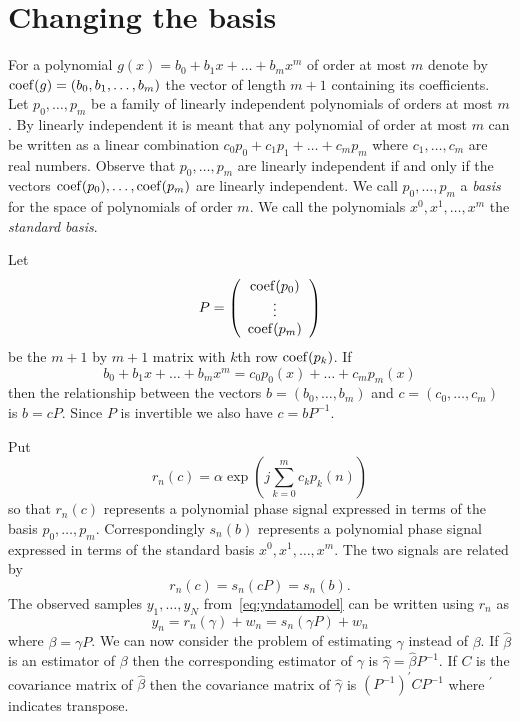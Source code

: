 \documentclass[review]{elsarticle}
\begin{document}
\section{Changing the basis}\label{sec:changing-basis}

\newcommand{\calP}{{\mathcal P}}

For a polynomial $g(x) = b_0 + b_1 x + \dots + b_m x^m$ of order at most $m$ denote by $\operatorname{coef}(g) = (b_0, b_1, \dots, b_m)$ the vector of length $m+1$ containing its coefficients.  Let $p_0,\dots, p_m$ be a family of linearly independent polynomials of orders at most $m$.  By linearly independent it is meant that any polynomial of order at most $m$ can be written as a linear combination $c_0p_0 + c_1 p_1 + \dots + c_m p_m$ where $c_1, \dots, c_m$ are real numbers.  Observe that $p_0, \dots, p_m$ are linearly independent if and only if the vectors $\operatorname{coef}(p_0), \dots, \operatorname{coef}(p_m)$ are linearly independent.  We call $p_0, \dots, p_m$ a \emph{basis} for the space of polynomials of order $m$.  We call the polynomials $x^0, x^1, \dots, x^m$ the \emph{standard basis}.  

Let 
\[
P = \left( \begin{array}{c}
\operatorname{coef}(p_0) \\
\vdots \\
\operatorname{coef}(p_m)
\end{array} \right)
\] 
be the $m+1$ by $m+1$ matrix with $k$th row $\operatorname{coef}(p_k)$.  If
\[
b_0 + b_1 x + \dots + b_m x^m = c_0 p_0(x) + \dots + c_m p_m(x)
\]
then the relationship between the vectors $b =  (b_0, \dots, b_m)$ and $c =  (c_0, \dots, c_m)$ is $b = cP$.  Since $P$ is invertible we also have $c = bP^{-1}$.

Put
\[
r_n(c) = \alpha \exp\left( j \sum_{k = 0}^{m}{c_k p_k(n)}\right)
\]
so that $r_n(c)$ represents a polynomial phase signal expressed in terms of the basis $p_0, \dots, p_m$.  Correspondingly $s_n(b)$ represents a polynomial phase signal expressed in terms of the standard basis $x^0, x^1, \dots, x^m$.  The two signals are related by
\[
r_n(c) = s_n(cP) = s_n(b).
\]
The observed samples $y_1,\dots,y_N$ from~\eqref{eq:yndatamodel} can be written using $r_n$ as
\[
y_n = r_n(\gamma) + w_n = s_n(\gamma P) + w_n
\]
where $\beta = \gamma P$.  We can now consider the problem of estimating $\gamma$ instead of $\beta$.  If $\hat{\beta}$ is an estimator of $\beta$ then the corresponding estimator of $\gamma$ is $\hat{\gamma} = \hat{\beta}P^{-1}$.  If $C$ is the covariance matrix of $\hat{\beta}$ then the covariance matrix of $\hat{\gamma}$ is $(P^{-1})^\prime C P^{-1}$ where $^\prime$ indicates transpose.
\end{document}
